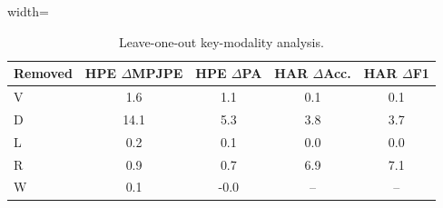 \begin{table}[H]
\centering
\caption{Leave-one-out key-modality analysis.}
\label{tab:loo}
\scriptsize
\begin{adjustbox}{width=\linewidth}
\begin{tabular}{lcccc}
\toprule
Removed & HPE $\Delta$MPJPE & HPE $\Delta$PA & HAR $\Delta$Acc. & HAR $\Delta$F1 \\
\midrule
V & 1.6 & 1.1 & 0.1 & 0.1 \\
D & 14.1 & 5.3 & 3.8 & 3.7 \\
L & 0.2 & 0.1 & 0.0 & 0.0 \\
R & 0.9 & 0.7 & 6.9 & 7.1 \\
W & 0.1 & -0.0 & -- & -- \\
\bottomrule
\end{tabular}
\end{adjustbox}
\end{table}
